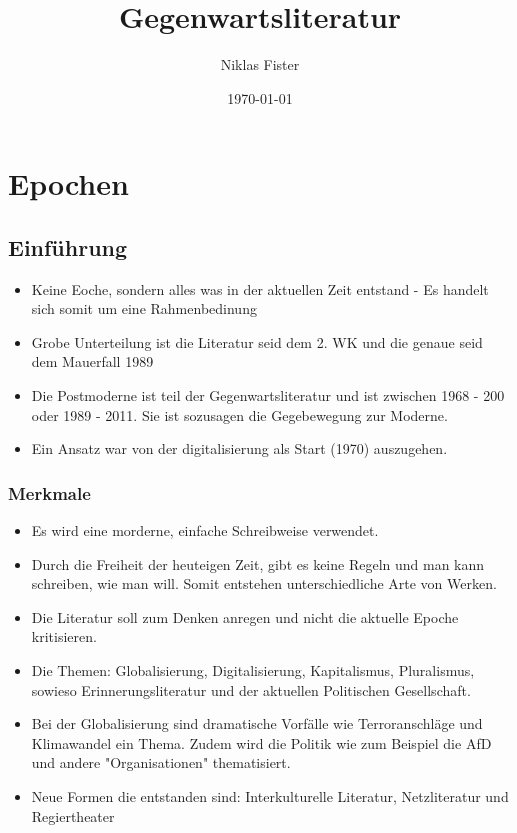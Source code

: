 \documentclass{article}
\title{\huge\textbf{Gegenwartsliteratur}}
\author{Niklas Fister}
\date{\today}
\begin{document}
\maketitle
\newpage

\section{Epochen}

\subsection{Einführung}
\begin{itemize}[parsep=0pt]
    \item Keine Eoche, sondern alles was in der aktuellen Zeit entstand - Es handelt sich somit um eine Rahmenbedinung
    \item Grobe Unterteilung ist die Literatur seid dem 2. WK und die genaue seid dem Mauerfall 1989
    \item Die Postmoderne ist teil der Gegenwartsliteratur und ist zwischen 1968 - 200 oder 1989 - 2011. Sie ist sozusagen die Gegebewegung zur Moderne.
    \item Ein Ansatz war von der digitalisierung als Start (1970) auszugehen.
\end{itemize}
\subsubsection{Merkmale}
\begin{itemize}[parsep=0pt]
    \item Es wird eine morderne, einfache Schreibweise verwendet.
    \item Durch die Freiheit der heuteigen Zeit, gibt es keine Regeln und man kann schreiben, wie man will. Somit entstehen unterschiedliche Arte von Werken.
    \item Die Literatur soll zum Denken anregen und nicht die aktuelle Epoche kritisieren.
    \item Die Themen: Globalisierung, Digitalisierung, Kapitalismus, Pluralismus, sowieso Erinnerungsliteratur und der aktuellen Politischen Gesellschaft.
    \item Bei der Globalisierung sind dramatische Vorfälle wie Terroranschläge und Klimawandel ein Thema. Zudem wird die Politik wie zum Beispiel die AfD und andere "Organisationen" thematisiert.
    \item Neue Formen die entstanden sind: Interkulturelle Literatur, Netzliteratur und Regiertheater
\end{itemize}
\end{document}
